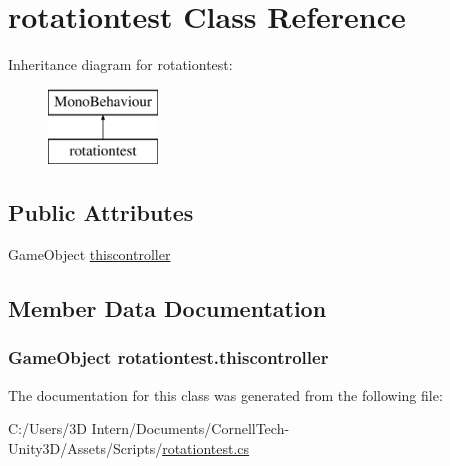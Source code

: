 \hypertarget{classrotationtest}{}\section{rotationtest Class Reference}
\label{classrotationtest}
Inheritance diagram for rotationtest\+:\begin{figure}[H]
\begin{center}
\leavevmode
\includegraphics[height=2.000000cm]{classrotationtest}
\end{center}
\end{figure}
\subsection*{Public Attributes}
\begin{DoxyCompactItemize}
\item 
Game\+Object \hyperlink{classrotationtest_a14f555b41e0d88f3de25ce4da8abde4a}{thiscontroller}
\end{DoxyCompactItemize}


\subsection{Member Data Documentation}
\subsubsection[{\texorpdfstring{thiscontroller}{thiscontroller}}]{\setlength{\rightskip}{0pt plus 5cm}Game\+Object rotationtest.\+thiscontroller}\hypertarget{classrotationtest_a14f555b41e0d88f3de25ce4da8abde4a}{}\label{classrotationtest_a14f555b41e0d88f3de25ce4da8abde4a}


The documentation for this class was generated from the following file\+:\begin{DoxyCompactItemize}
\item 
C\+:/\+Users/3\+D Intern/\+Documents/\+Cornell\+Tech-\/\+Unity3\+D/\+Assets/\+Scripts/\hyperlink{rotationtest_8cs}{rotationtest.\+cs}\end{DoxyCompactItemize}
